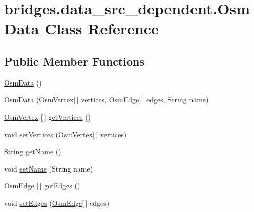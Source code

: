 \hypertarget{classbridges_1_1data__src__dependent_1_1_osm_data}{}\section{bridges.\+data\+\_\+src\+\_\+dependent.\+Osm\+Data Class Reference}
\label{classbridges_1_1data__src__dependent_1_1_osm_data}
\subsection*{Public Member Functions}
\begin{DoxyCompactItemize}
\item 
\hyperlink{classbridges_1_1data__src__dependent_1_1_osm_data_a1ba678dfedee33772a620d678f7a04d8}{Osm\+Data} ()
\item 
\hyperlink{classbridges_1_1data__src__dependent_1_1_osm_data_a822667d3269b059bf14e80c36b12fbb9}{Osm\+Data} (\hyperlink{classbridges_1_1data__src__dependent_1_1_osm_vertex}{Osm\+Vertex}\mbox{[}$\,$\mbox{]} vertices, \hyperlink{classbridges_1_1data__src__dependent_1_1_osm_edge}{Osm\+Edge}\mbox{[}$\,$\mbox{]} edges, String name)
\item 
\hyperlink{classbridges_1_1data__src__dependent_1_1_osm_vertex}{Osm\+Vertex} \mbox{[}$\,$\mbox{]} \hyperlink{classbridges_1_1data__src__dependent_1_1_osm_data_a4dc0a205132f1143e628398e08057362}{get\+Vertices} ()
\item 
void \hyperlink{classbridges_1_1data__src__dependent_1_1_osm_data_ad31b467d79dd0b76f75f93b5e192e1e3}{set\+Vertices} (\hyperlink{classbridges_1_1data__src__dependent_1_1_osm_vertex}{Osm\+Vertex}\mbox{[}$\,$\mbox{]} vertices)
\item 
String \hyperlink{classbridges_1_1data__src__dependent_1_1_osm_data_ab239e638adb7cd65a3fc7e735f6d1e61}{get\+Name} ()
\item 
void \hyperlink{classbridges_1_1data__src__dependent_1_1_osm_data_abdc3131be4ca17fcf53a5728a7932bda}{set\+Name} (String name)
\item 
\hyperlink{classbridges_1_1data__src__dependent_1_1_osm_edge}{Osm\+Edge} \mbox{[}$\,$\mbox{]} \hyperlink{classbridges_1_1data__src__dependent_1_1_osm_data_a1ceb1a4b7acd75ca655ad0769f6b427d}{get\+Edges} ()
\item 
void \hyperlink{classbridges_1_1data__src__dependent_1_1_osm_data_a88cf686718bcd27a82e2c8fb74b649f2}{set\+Edges} (\hyperlink{classbridges_1_1data__src__dependent_1_1_osm_edge}{Osm\+Edge}\mbox{[}$\,$\mbox{]} edges)

\end{DoxyCompactItemize}
